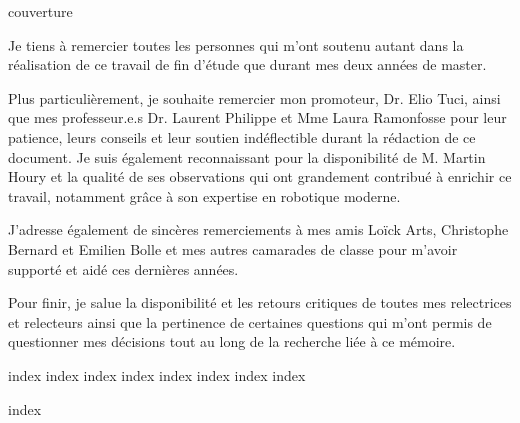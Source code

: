 \documentclass[12pt]{article}
\begin{document}
{couverture}

\thispagestyle{empty}\vspace*{\fill}%
\begin{center}
Je tiens à remercier toutes les personnes qui m'ont soutenu autant dans la réalisation de ce travail de fin d'étude que durant mes deux années de master.

Plus particulièrement, je souhaite remercier mon promoteur, Dr. Elio Tuci, ainsi que mes professeur.e.s Dr. Laurent Philippe et Mme Laura Ramonfosse pour leur patience, leurs conseils et leur soutien indéflectible durant la rédaction de ce document.
Je suis également reconnaissant pour la disponibilité de M. Martin Houry et la qualité de ses observations qui ont grandement contribué à enrichir ce travail, notamment grâce à son expertise en robotique moderne.

J'adresse également de sincères remerciements à mes amis Loïck Arts, Christophe Bernard et Emilien Bolle et mes autres camarades de classe pour m'avoir supporté et aidé ces dernières années.

Pour finir, je salue la disponibilité et les retours critiques de toutes mes relectrices et relecteurs ainsi que la pertinence de certaines questions qui m'ont permis de questionner mes décisions tout au long de la recherche liée à ce mémoire.
\end{center}%
\vfill\cleardoublepage%

\tableofcontents
\listoffigures
\listoftables
\printglossaries %
\vfill\cleardoublepage%

{index}
{index}
{index}
{index}
{index}
{index}
{index}
{index}

\printbibliography[title={Bibliographie},heading=bibnumbered,prenote={bib-intro}]

{index}
\end{document}
